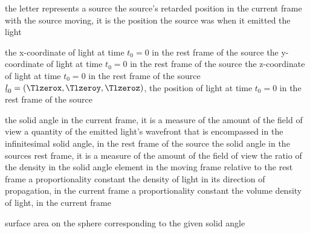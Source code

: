 {the letter represents a source}
{the source's retarded position in the current frame with the source moving, it is the position the source was when it emitted the light}

{the x-coordinate of light at time $t_0=0$ in the rest frame of the source}
{the y-coordinate of light at time $t_0=0$ in the rest frame of the source}
{the z-coordinate of light at time $t_0=0$ in the rest frame of the source}
{$\underline{l}_0=(\Tlzerox,\Tlzeroy,\Tlzeroz)$, the position of light at time $t_0=0$ in the rest frame of the source}

\variableterm{\TOmega}{\Omega}
{the solid angle in the current frame, it is a measure of the amount of the field of view}
{a quantity of the emitted light's wavefront that is encompassed in the infinitesimal solid angle, in the rest frame of the source}
{the solid angle in the sources rest frame, it is a measure of the amount of the field of view}
{the ratio of the density in the solid angle element in the moving frame relative to the rest frame}
{a proportionality constant}
{the density of light in its direction of propagation, in the current frame}
{a proportionality constant}
{the volume density of light, in the current frame}

{surface area on the sphere corresponding to the given solid angle}
